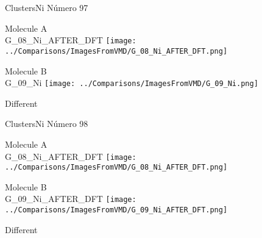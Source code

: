  \newpage

\vtab[-3cm]
\begin{center}
{\large ClustersNi \tab Número 97}
\end{center}
\begin{multicols}{2}
\begin{center}
Molecule A \\ 
G\_08\_Ni\_AFTER\_DFT
\texttt{[image: ../Comparisons/ImagesFromVMD/G\_08\_Ni\_AFTER\_DFT.png]}
\\
\vtab

\columnbreak
Molecule B \\ 
G\_09\_Ni
\texttt{[image: ../Comparisons/ImagesFromVMD/G\_09\_Ni.png]}
\\
\vtab


\end{center}
\end{multicols}
\begin{center}
\textcolor{NavyBlue}{\Large Different}
\end{center}

 \newpage

\vtab[-3cm]
\begin{center}
{\large ClustersNi \tab Número 98}
\end{center}
\begin{multicols}{2}
\begin{center}
Molecule A \\ 
G\_08\_Ni\_AFTER\_DFT
\texttt{[image: ../Comparisons/ImagesFromVMD/G\_08\_Ni\_AFTER\_DFT.png]}
\\
\vtab

\columnbreak
Molecule B \\ 
G\_09\_Ni\_AFTER\_DFT
\texttt{[image: ../Comparisons/ImagesFromVMD/G\_09\_Ni\_AFTER\_DFT.png]}
\\
\vtab


\end{center}
\end{multicols}
\begin{center}
\textcolor{NavyBlue}{\Large Different}
\end{center}

 \newpage

